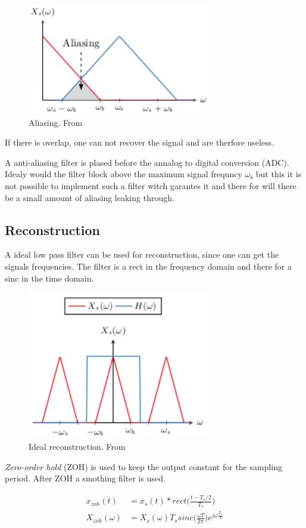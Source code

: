 \begin{multicols}{2}
\begin{figure}[H]
    \centering
    \includegraphics[width=8cm]{image/aliasing.pdf}
    \caption{Aliasing. From \cite{st}}
    \label{fig:aliasing}
\end{figure}
If there is overlap, one can not recover the signal and are therfore useless.

A anti-aliasing filter is plased before the annalog to digital conversion (ADC).
Idealy would the filter block above the maximum signal frequncy $\omega_b$ but this 
it is not possible to implement such a filter witch garantes it and there for will 
there be a small amount of aliasing leaking through.


\subsection{Reconstruction}
A ideal low pass filter can be used for reconstruction, since one can get the signals frequencies.
The filter is a rect in the frequency domain and there for a sinc in the time domain.
\begin{figure}[H]
    \centering
    \includegraphics[width=8cm]{image/ideal_reconstruction.pdf}
    \caption{Ideal reconstruction. From \cite{st}}
    \label{fig:ideal_reconstcion}
\end{figure}

\textit{Zero-order hold} (ZOH) is used to keep the output constant for the sampling period.
After ZOH a smothing filter is used.

\begin{align*}
    x_{zoh}(t) &= x_s(t)*rect\Big(\frac{t-T_s/2}{T_s}\Big) \\
    X_{zoh}(\omega) &= X_s(\omega)T_s sinc\Big(\frac{\omega T}{2\pi}\Big)e^{j\omega\frac{T_s}{2}}
\end{align*}
\end{multicols}
\raggedcolumns


